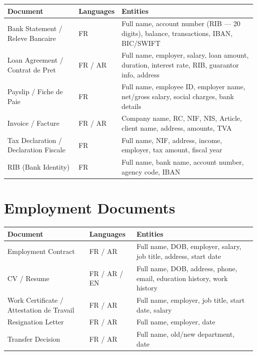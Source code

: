 \documentclass[11pt,a4paper]{article}
\begin{document}
\begin{longtable}{|p{4.5cm}|p{2cm}|p{9cm}|}
\hline
\textbf{Document} & \textbf{Languages} & \textbf{Entities} \\
\hline
\endhead

Bank Statement / Releve Bancaire
&
FR
&
Full name, account number (RIB --- 20 digits), balance, transactions, IBAN, BIC/SWIFT
\\ \hline

Loan Agreement / Contrat de Pret
&
FR / AR
&
Full name, employer, salary, loan amount, duration, interest rate, RIB, guarantor info, address
\\ \hline

Payslip / Fiche de Paie
&
FR
&
Full name, employee ID, employer name, net/gross salary, social charges, bank details
\\ \hline

Invoice / Facture
&
FR / AR
&
Company name, RC, NIF, NIS, Article, client name, address, amounts, TVA
\\ \hline

Tax Declaration / Declaration Fiscale
&
FR
&
Full name, NIF, address, income, employer, tax amount, fiscal year
\\ \hline

RIB (Bank Identity)
&
FR
&
Full name, bank name, account number, agency code, IBAN
\\ \hline

\end{longtable}

\section{Employment Documents}

\begin{longtable}{|p{4.5cm}|p{2.5cm}|p{8.5cm}|}
\hline
\textbf{Document} & \textbf{Languages} & \textbf{Entities} \\
\hline
\endhead

Employment Contract
&
FR / AR
&
Full name, DOB, employer, salary, job title, address, start date
\\ \hline

CV / Resume
&
FR / AR / EN
&
Full name, DOB, address, phone, email, education history, work history
\\ \hline

Work Certificate / Attestation de Travail
&
FR / AR
&
Full name, employer, job title, start date, salary
\\ \hline

Resignation Letter
&
FR / AR
&
Full name, employer, date
\\ \hline

Transfer Decision
&
FR / AR
&
Full name, old/new department, date
\\ \hline

\end{longtable}
\end{document}
